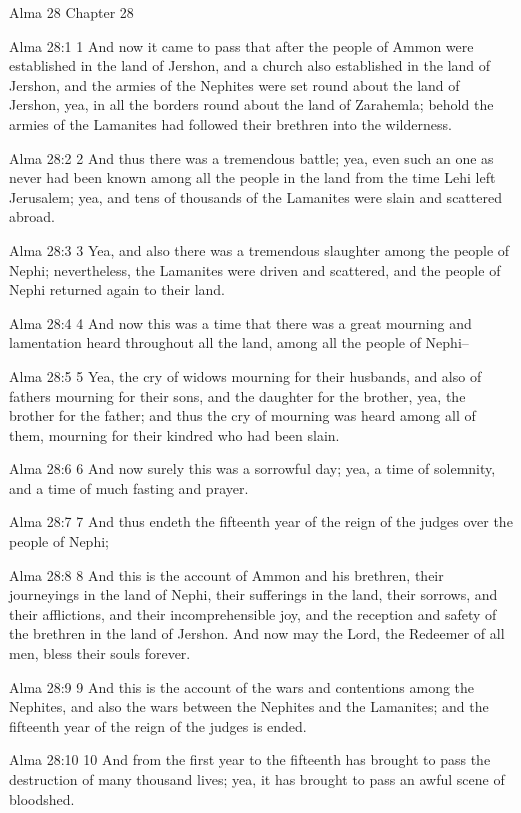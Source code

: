 Alma 28
Chapter 28

Alma 28:1
 1 And now it came to pass that after the people of Ammon were
established in the land of Jershon, and a church also established
in the land of Jershon, and the armies of the Nephites were set
round about the land of Jershon, yea, in all the borders round
about the land of Zarahemla; behold the armies of the Lamanites
had followed their brethren into the wilderness.

Alma 28:2
 2 And thus there was a tremendous battle; yea, even such an one
as never had been known among all the people in the land from the
time Lehi left Jerusalem; yea, and tens of thousands of the
Lamanites were slain and scattered abroad.

Alma 28:3
 3 Yea, and also there was a tremendous slaughter among the
people of Nephi; nevertheless, the Lamanites were driven and
scattered, and the people of Nephi returned again to their land.

Alma 28:4
 4 And now this was a time that there was a great mourning and
lamentation heard throughout all the land, among all the people
of Nephi--

Alma 28:5
 5 Yea, the cry of widows mourning for their husbands, and also
of fathers mourning for their sons, and the daughter for the
brother, yea, the brother for the father; and thus the cry of
mourning was heard among all of them, mourning for their kindred
who had been slain.

Alma 28:6
 6 And now surely this was a sorrowful day; yea, a time of
solemnity, and a time of much fasting and prayer.

Alma 28:7
 7 And thus endeth the fifteenth year of the reign of the judges
over the people of Nephi;

Alma 28:8
 8 And this is the account of Ammon and his brethren, their
journeyings in the land of Nephi, their sufferings in the land,
their sorrows, and their afflictions, and their incomprehensible
joy, and the reception and safety of the brethren in the land of
Jershon. And now may the Lord, the Redeemer of all men, bless
their souls forever.

Alma 28:9
 9 And this is the account of the wars and contentions among the
Nephites, and also the wars between the Nephites and the
Lamanites; and the fifteenth year of the reign of the judges is
ended.

Alma 28:10
 10 And from the first year to the fifteenth has brought to pass
the destruction of many thousand lives; yea, it has brought to
pass an awful scene of bloodshed.

